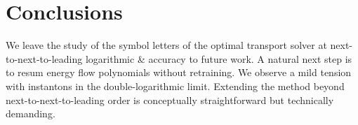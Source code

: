\section{Conclusions}\label{sec:conclusions}

We leave the study of the symbol letters of the optimal transport solver
at next-to-next-to-leading logarithmic & accuracy to future work. A
natural next step is to resum energy flow polynomials without
retraining. We observe a mild tension with instantons in the
double-logarithmic limit. Extending the method beyond
next-to-next-to-leading order is conceptually straightforward but
technically demanding.

